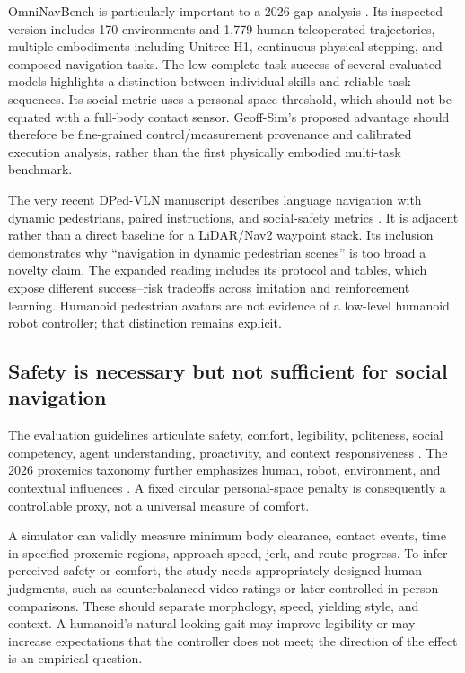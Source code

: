 \documentclass[11pt,a4paper]{article}
\begin{document}
OmniNavBench is particularly important to a 2026 gap analysis
\citep{omninav}. Its inspected version includes 170 environments and 1,779
human-teleoperated trajectories, multiple embodiments including Unitree H1,
continuous physical stepping, and composed navigation tasks. The low
complete-task success of several evaluated models highlights a distinction
between individual skills and reliable task sequences. Its social metric
uses a personal-space threshold, which should not be equated with a
full-body contact sensor. Geoff-Sim's proposed advantage should therefore
be fine-grained control/measurement provenance and calibrated execution
analysis, rather than the first physically embodied multi-task benchmark.

The very recent DPed-VLN manuscript describes language navigation with dynamic
pedestrians, paired instructions, and social-safety metrics \citep{dped}.
It is adjacent rather than a direct baseline for a LiDAR/Nav2 waypoint stack.
Its inclusion demonstrates why ``navigation in dynamic pedestrian scenes''
is too broad a novelty claim. The expanded reading includes its protocol and
tables, which expose different success--risk tradeoffs across imitation and
reinforcement learning. Humanoid pedestrian avatars are not evidence of a
low-level humanoid robot controller; that distinction remains explicit.

\subsection{Safety is necessary but not sufficient for social navigation}
The evaluation guidelines articulate safety, comfort, legibility,
politeness, social competency, agent understanding, proactivity, and context
responsiveness \citep{guidelines}. The 2026 proxemics taxonomy further
emphasizes human, robot, environment, and contextual influences
\citep{proxemics2026}. A fixed circular personal-space penalty is consequently
a controllable proxy, not a universal measure of comfort.

A simulator can validly measure minimum body clearance, contact events,
time in specified proxemic regions, approach speed, jerk, and route progress.
To infer perceived safety or comfort, the study needs appropriately designed
human judgments, such as counterbalanced video ratings or later controlled
in-person comparisons. These should separate morphology, speed, yielding
style, and context. A humanoid's natural-looking gait may improve legibility
or may increase expectations that the controller does not meet; the direction
of the effect is an empirical question.
\end{document}
